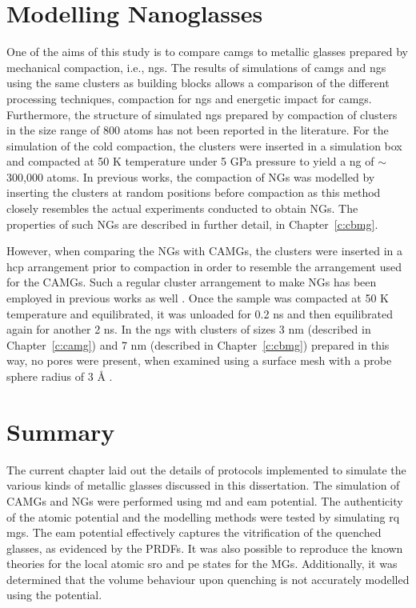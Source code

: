 %
\section{Modelling Nanoglasses}
\begin{changebar}
One of the aims of this study is to compare \gls{camg}s to metallic glasses prepared by mechanical compaction, i.e., \gls{ng}s. The results of simulations of \gls{camg}s and \gls{ng}s using the same clusters as building blocks allows a comparison of the different processing techniques, compaction for \gls{ng}s and energetic impact for \gls{camg}s. Furthermore, the structure of simulated \gls{ng}s prepared by compaction of clusters in the size range of 800 atoms has not been reported in the literature. For the simulation of the cold compaction, the clusters were inserted in a simulation box and compacted at 50 K temperature under 5 GPa pressure to yield a \gls{ng} of $\sim$300,000 atoms. In previous works, the compaction of NGs was modelled by inserting the clusters at random positions before compaction  \cite{Adjaoud2018,Kalcher2017} as this method closely resembles the actual experiments conducted to obtain NGs. The properties of such NGs are described in further detail, in Chapter~\ref{c:cbmg}. \par

However, when comparing the NGs with CAMGs, the clusters were inserted in a \gls{hcp} arrangement prior to compaction in order to resemble the arrangement used for the CAMGs. Such a regular cluster arrangement to make NGs has been employed in previous works as well \cite{Sopu2009,Cheng2019,Cheng2019a,Zheng2021}. Once the sample was compacted at 50 K temperature and equilibrated, it was unloaded for 0.2 ns and then equilibrated again for another 2 ns. In the \gls{ng}s with clusters of sizes 3 nm (described in Chapter~\ref{c:camg}) and 7 nm (described in Chapter~\ref{c:cbmg}) prepared in this way, no pores were present, when examined using a surface mesh with a probe sphere radius of 3 \r{A} \cite{Stukowski2010a,Stukowski2014}. \par
\end{changebar}

\clearpage

\section{Summary}
The current chapter laid out the details of protocols implemented to simulate the various kinds of metallic glasses discussed in this dissertation. The simulation of CAMGs and NGs were performed using \gls{md} and \gls{eam} potential. The authenticity of the atomic potential and the modelling methods were tested by simulating \gls{rq} \gls{mg}s. The \gls{eam} potential effectively captures the vitrification of the quenched glasses, as evidenced by the PRDFs. It was also possible to reproduce the known theories for the local atomic \gls{sro} and \gls{pe} states for the MGs. Additionally, it was determined that the volume behaviour upon quenching is not accurately modelled using the potential. \par

